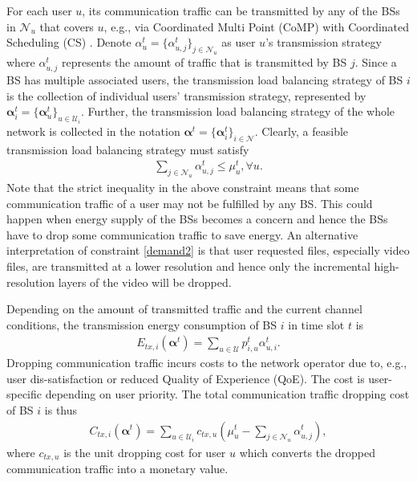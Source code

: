 \documentclass[12pt, draftclsnofoot, letterpaper, onecolumn]{IEEEtran}
\begin{document}
For each user $u$, its communication traffic can be transmitted by any of the BSs in $\mathcal{N}_u$ that covers $u$, e.g., via Coordinated Multi Point (CoMP) with Coordinated Scheduling (CS) \cite{Lee2012}. Denote $\alpha^t_u = \{\alpha^t_{u,j}\}_{j\in\mathcal{N}_u}$ as user $u$'s transmission strategy where $\alpha^t_{u,j}$ represents the amount of traffic that is transmitted by BS $j$. Since a BS has multiple associated users, the transmission load balancing strategy of BS $i$ is the collection of individual users' transmission strategy, represented by $\bm\alpha^t_i = \{\bm\alpha^t_u\}_{u\in\mathcal{U}_i}$. Further, the transmission load balancing strategy of the whole network is collected in the notation $\bm\alpha^t = \{\bm\alpha^t_i\}_{i\in\mathcal{N}}$. Clearly, a feasible transmission load balancing strategy must satisfy
\begin{align}\label{demand2}
\sum_{j\in\mathcal{N}_u}\alpha^t_{u,j} \leq \mu^t_u, \forall u.
\end{align}
Note that the strict inequality in the above constraint means that some communication traffic of a user may not be fulfilled by any BS. This could happen when energy supply of the BSs becomes a concern and hence the BSs have to drop some communication traffic to save energy. An alternative interpretation of constraint \eqref{demand2} is that user requested files, especially video files, are transmitted at a lower resolution and hence only the incremental high-resolution layers of the video will be dropped.


Depending on the amount of transmitted traffic and the current channel conditions, the transmission energy consumption of BS $i$ in time slot $t$ is
\begin{align}
E_{tx,i}(\bm\alpha^t) = \sum_{u \in \mathcal{U}}p^t_{i,u}\alpha^t_{u,i}.
\end{align}
Dropping communication traffic incurs costs to the network operator due to, e.g., user dis-satisfaction or reduced Quality of Experience (QoE). The cost is user-specific depending on user priority. The total communication traffic dropping cost of BS $i$ is thus
\begin{align}
C_{tx, i}(\bm\alpha^t) = \sum_{u\in\mathcal{U}_i}c_{tx, u}(\mu^t_u - \sum_{j\in\mathcal{N}_u}\alpha^t_{u,j}),
\end{align}
where $c_{tx,u}$ is the unit dropping cost for user $u$ which converts the dropped communication traffic into a monetary value.
\end{document}
